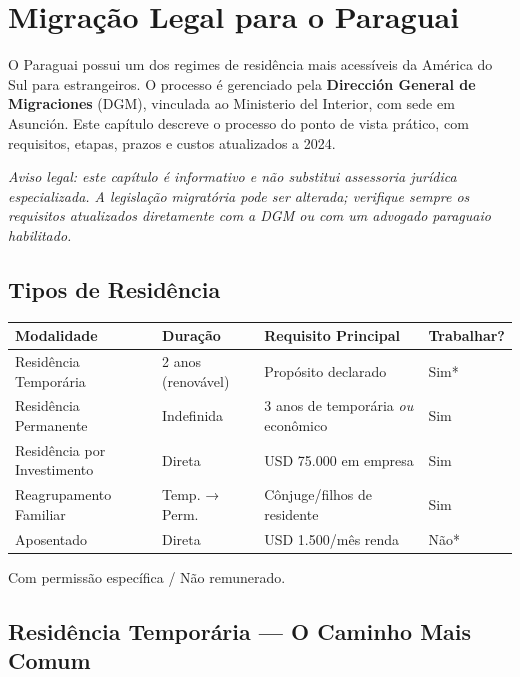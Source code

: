 \chapter{Migração Legal para o Paraguai}\label{migracao-legal}

O Paraguai possui um dos regimes de residência mais acessíveis da América do Sul para estrangeiros. O processo é gerenciado pela \textbf{Dirección General de Migraciones} (DGM), vinculada ao Ministerio del Interior, com sede em Asunción. Este capítulo descreve o processo do ponto de vista prático, com requisitos, etapas, prazos e custos atualizados a 2024.

\medskip
\textit{Aviso legal: este capítulo é informativo e não substitui assessoria jurídica especializada. A legislação migratória pode ser alterada; verifique sempre os requisitos atualizados diretamente com a DGM ou com um advogado paraguaio habilitado.}

\section*{Tipos de Residência}

\small
\begin{tabularx}{\linewidth}{p{2.8cm}p{2.0cm}Xp{2.0cm}}
\toprule
\textbf{Modalidade} & \textbf{Duração} & \textbf{Requisito Principal} & \textbf{Trabalhar?} \\
\midrule
Residência Temporária & 2 anos (renovável) & Propósito declarado & Sim* \\
Residência Permanente & Indefinida & 3 anos de temporária \textit{ou} econômico & Sim \\
Residência por Investimento & Direta & USD 75.000 em empresa & Sim \\
Reagrupamento Familiar & Temp. → Perm. & Cônjuge/filhos de residente & Sim \\
Aposentado & Direta & USD 1.500/mês renda & Não* \\
\bottomrule
\end{tabularx}
\vspace{-0.3em}\footnotesize *Com permissão específica / Não remunerado.\normalsize

\section*{Residência Temporária --- O Caminho Mais Comum}

